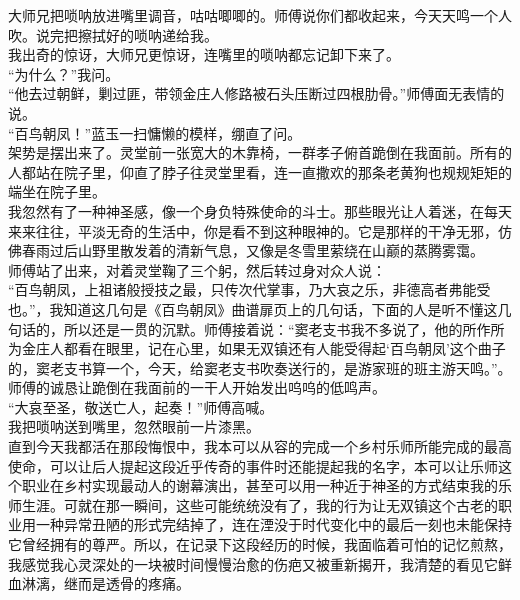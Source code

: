 大师兄把唢呐放进嘴里调音，咕咕唧唧的。师傅说你们都收起来，今天天鸣一个人吹。说完把擦拭好的唢呐递给我。\\

我出奇的惊讶，大师兄更惊讶，连嘴里的唢呐都忘记卸下来了。\\

“为什么？”我问。\\

“他去过朝鲜，剿过匪，带领金庄人修路被石头压断过四根肋骨。”师傅面无表情的说。\\

“百鸟朝凤！”蓝玉一扫慵懒的模样，绷直了问。\\

架势是摆出来了。灵堂前一张宽大的木靠椅，一群孝子俯首跪倒在我面前。所有的人都站在院子里，仰直了脖子往灵堂里看，连一直撒欢的那条老黄狗也规规矩矩的端坐在院子里。\\

我忽然有了一种神圣感，像一个身负特殊使命的斗士。那些眼光让人着迷，在每天来来往往，平淡无奇的生活中，你是看不到这种眼神的。它是那样的干净无邪，仿佛春雨过后山野里散发着的清新气息，又像是冬雪里萦绕在山巅的蒸腾雾霭。\\

师傅站了出来，对着灵堂鞠了三个躬，然后转过身对众人说：\\

“百鸟朝凤，上祖诸般授技之最，只传次代掌事，乃大哀之乐，非德高者弗能受也。”，我知道这几句是《百鸟朝凤》曲谱扉页上的几句话，下面的人是听不懂这几句话的，所以还是一贯的沉默。师傅接着说：“窦老支书我不多说了，他的所作所为金庄人都看在眼里，记在心里，如果无双镇还有人能受得起‘百鸟朝凤’这个曲子的，窦老支书算一个，今天，给窦老支书吹奏送行的，是游家班的班主游天鸣。”。师傅的诚恳让跪倒在我面前的一干人开始发出呜呜的低鸣声。\\

“大哀至圣，敬送亡人，起奏！”师傅高喊。\\

我把唢呐送到嘴里，忽然眼前一片漆黑。\\

直到今天我都活在那段悔恨中，我本可以从容的完成一个乡村乐师所能完成的最高使命，可以让后人提起这段近乎传奇的事件时还能提起我的名字，本可以让乐师这个职业在乡村实现最动人的谢幕演出，甚至可以用一种近于神圣的方式结束我的乐师生涯。可就在那一瞬间，这些可能统统没有了，我的行为让无双镇这个古老的职业用一种异常丑陋的形式完结掉了，连在湮没于时代变化中的最后一刻也未能保持它曾经拥有的尊严。所以，在记录下这段经历的时候，我面临着可怕的记忆煎熬，我感觉我心灵深处的一块被时间慢慢治愈的伤疤又被重新揭开，我清楚的看见它鲜血淋漓，继而是透骨的疼痛。\\

